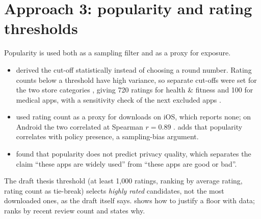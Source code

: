 \section{Approach 3: popularity and rating thresholds}
Popularity is used both as a sampling filter and as a proxy for exposure.
\begin{itemize}
\item {} derived the cut-off statistically instead of choosing a round number. Rating counts below a threshold have high variance, so separate cut-offs were set for the two store categories , giving 720 ratings for health \& fitness and 100 for medical apps, with a sensitivity check of the next excluded apps .
\item {} used rating count as a proxy for downloads on iOS, which reports none; on Android the two correlated at Spearman $r=0.89$ .  adds that popularity correlates with policy presence, a sampling-bias argument.
\item {} found that popularity does not predict privacy quality, which separates the claim ``these apps are widely used'' from ``these apps are good or bad''.
\end{itemize}
The draft thesis threshold (at least 1{,}000 ratings, ranking by average rating, rating count as tie-break) selects \emph{highly rated} candidates, not the most downloaded ones, as the draft itself says.  shows how to justify a floor with data;  ranks by recent review count and states why.

